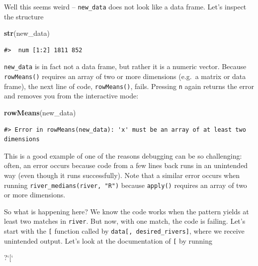 \documentclass[
]{book}
\newenvironment{Shaded}{\begin{snugshade}}{\end{snugshade}}
\newcommand{\DataTypeTok}[1]{\textcolor[rgb]{0.13,0.29,0.53}{#1}}
\newcommand{\KeywordTok}[1]{\textcolor[rgb]{0.13,0.29,0.53}{\textbf{#1}}}
\newcommand{\NormalTok}[1]{#1}
\newcommand{\StringTok}[1]{\textcolor[rgb]{0.31,0.60,0.02}{#1}}
\begin{document}
Well this seems weird -- \texttt{new\_data} does not look like a data frame. Let's inspect the structure

\begin{Shaded}
\begin{Highlighting}[]
\KeywordTok{str}\NormalTok{(new_data)}
\end{Highlighting}
\end{Shaded}

\begin{verbatim}
#>  num [1:2] 1811 852
\end{verbatim}

\texttt{new\_data} is in fact not a data frame, but rather it is a numeric vector. Because \texttt{rowMeans()} requires an array of two or more dimensions (e.g.~a matrix or data frame), the next line of code, \texttt{rowMeans()}, fails. Pressing \texttt{n} again returns the error and removes you from the interactive mode:

\begin{Shaded}
\begin{Highlighting}[]
\KeywordTok{rowMeans}\NormalTok{(new_data)}
\end{Highlighting}
\end{Shaded}

\begin{verbatim}
#> Error in rowMeans(new_data): 'x' must be an array of at least two dimensions
\end{verbatim}

This is a good example of one of the reasons debugging can be so challenging: often, an error occurs because code from a few lines back runs in an unintended way (even though it runs successfully). Note that a similar error occurs when running \texttt{river\_medians(river,\ "R")} because \texttt{apply()} requires an array of two or more dimensions.

So what is happening here? We know the code works when the pattern yields at least two matches in \texttt{river}. But now, with one match, the code is failing. Let's start with the \texttt{{[}} function called by \texttt{data{[},\ desired\_rivers{]}}, where we receive unintended output. Let's look at the documentation of \texttt{{[}} by running

\begin{Shaded}
\begin{Highlighting}[]
\NormalTok{?}\StringTok{`}\DataTypeTok{[}\StringTok{`}
\end{Highlighting}
\end{Shaded}
\end{document}
